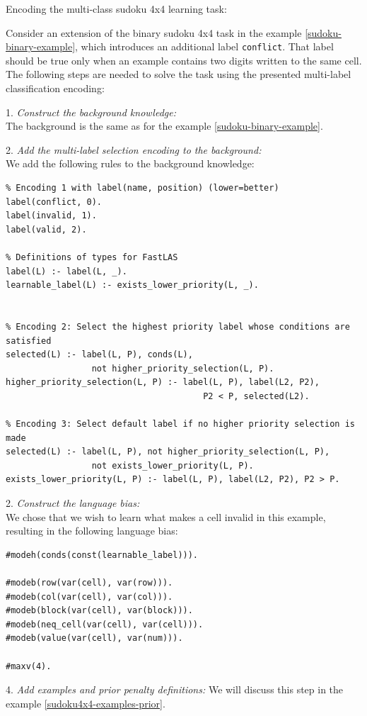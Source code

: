 \begin{example}
Encoding the multi-class sudoku 4x4 learning task:

Consider an extension of the binary sudoku 4x4 task in the example \ref{sudoku-binary-example}, which introduces an additional label \verb_conflict_. 
That label should be true only when an example contains two digits written to the same cell.
The following steps are needed to solve the task using the presented multi-label classification encoding:

1. \textit{Construct the background knowledge:} \\
The background is the same as for the example \ref{sudoku-binary-example}.

2. \textit{Add the multi-label selection encoding to the background:} \\
We add the following rules to the background knowledge:
\begin{lstlisting}
% Encoding 1 with label(name, position) (lower=better)
label(conflict, 0).
label(invalid, 1).
label(valid, 2).

% Definitions of types for FastLAS
label(L) :- label(L, _).
learnable_label(L) :- exists_lower_priority(L, _).


% Encoding 2: Select the highest priority label whose conditions are satisfied
selected(L) :- label(L, P), conds(L), 
                 not higher_priority_selection(L, P).
higher_priority_selection(L, P) :- label(L, P), label(L2, P2), 
                                       P2 < P, selected(L2).

% Encoding 3: Select default label if no higher priority selection is made
selected(L) :- label(L, P), not higher_priority_selection(L, P), 
                 not exists_lower_priority(L, P).
exists_lower_priority(L, P) :- label(L, P), label(L2, P2), P2 > P.
\end{lstlisting}

2. \textit{Construct the language bias:} \\
We chose that we wish to learn what makes a cell invalid in this example, resulting in the following language bias:
\begin{verbatim}
#modeh(conds(const(learnable_label))).

#modeb(row(var(cell), var(row))).
#modeb(col(var(cell), var(col))).
#modeb(block(var(cell), var(block))).
#modeb(neq_cell(var(cell), var(cell))).
#modeb(value(var(cell), var(num))).

#maxv(4).
\end{verbatim}

4. \textit{Add examples and prior penalty definitions:}
We will discuss this step in the example \ref{sudoku4x4-examples-prior}.
\end{example}



